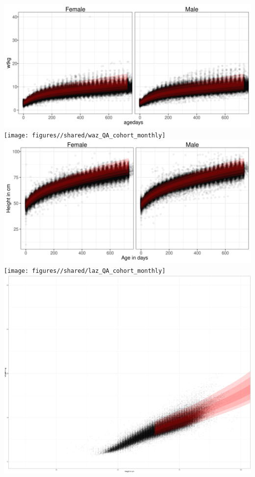 \documentclass[
  9pt,
]{book}
\begin{document}
\includegraphics[width=33.33in]{figures//shared/waz_QA_monthly}
\texttt{[image: figures//shared/waz\_QA\_cohort\_monthly]}
\includegraphics[width=33.33in]{figures//shared/laz_QA_monthly}
\texttt{[image: figures//shared/laz\_QA\_cohort\_monthly]}
\includegraphics[width=104.17in]{figures//shared/wlz_QA_monthly}
\end{document}
